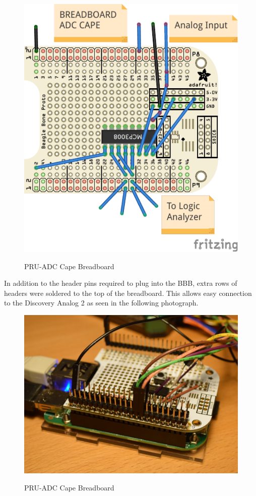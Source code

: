 \begin{figure}[H]
	\centering
	\includegraphics[]{../../pcb/adafruit_proto_cape_bb-crop}
	\centering\bfseries
	\caption{PRU-ADC Cape Breadboard}
\end{figure}

In addition to the header pins required to plug into the BBB, extra rows of headers were soldered to the top of the breadboard.  This allows easy connection to the Discovery Analog 2 as seen in the following photograph.

\begin{figure}[H]
	\centering
	\includegraphics{photos/DSC_0025}
	\centering\bfseries
	\caption{PRU-ADC Cape Breadboard}
\end{figure}

